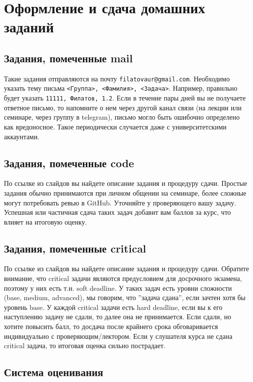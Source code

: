 \documentclass[a4paper, 12pt]{extarticle}
\title{}
\author{}
\date{}
\begin{document}
\section*{Оформление и сдача домашних заданий}

\subsection*{Задания, помеченные mail}

Такие задания отправляются на почту \texttt{filatovaur@gmail.com}. Необходимо указать тему письма \texttt{<Группа>, <Фамилия>, <Задача>}.
Например, правильно будет указать \texttt{11111, Филатов, 1.2}. Если в течение пары дней вы не получаете ответное письмо, то напомните о нем через другой канал связи (на лекции или семинаре, через группу в telegram), письмо могло быть ошибочно определено как вредоносное. Такое периодически случается даже с университетскими аккаунтами.

\subsection*{Задания, помеченные code}

По ссылке из слайдов вы найдете описание задания и процедуру сдачи. Простые задания обычно принимаются при личном общении на семинаре, более сложные могут потребовать ревью в GitHub. Уточняйте у проверяющего вашу задачу. Успешная или частичная сдача таких задач добавит вам баллов за курс, что влияет на итоговую оценку.

\subsection*{Задания, помеченные critical}

По ссылке из слайдов вы найдете описание задания и процедуру сдачи. Обратите внимание, что critical задачи являются предусловием для досрочного экзамена, поэтому у них есть т.н. soft deadline. У таких задач есть уровни сложности (base, medium, advanced), мы говорим, что ''задача сдана'', если зачтен хотя бы уровень base.  У каждой critical задачи есть hard deadline, если вы к его наступлению задачу не сдали, то далее она не принимается. Если сдали, но хотите повысить балл, то досдача после крайнего срока обговаривается индивидуально с проверяющим/лектором. Если у слушателя курса не сдана critical задача, то итоговая оценка сильно пострадает.

\subsection*{Система оценивания}
\end{document}
